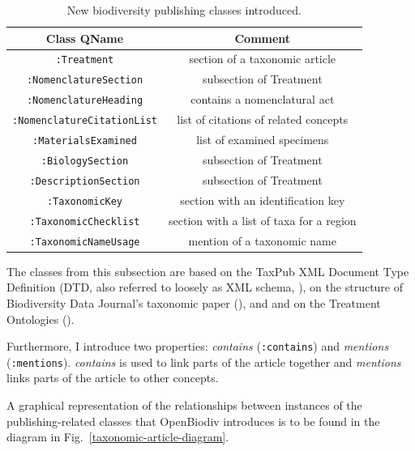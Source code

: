 \begin{table}[h!]
\caption{New biodiversity publishing classes introduced.}
      \begin{tabular}{cc}
        \hline
          Class QName             & Comment\\  \hline
  {\tt :Treatment}                & section of a taxonomic article\\
  {\tt :NomenclatureSection}      & subsection of Treatment\\
  {\tt :NomenclatureHeading}      & contains a nomenclatural act \\
  {\tt :NomenclatureCitationList} & list of citations of related concepts\\
  {\tt :MaterialsExamined}        & list of examined specimens\\
  {\tt :BiologySection}           & subsection of Treatment\\
  {\tt :DescriptionSection}       & subsection of Treatment\\
  {\tt :TaxonomicKey}             & section with an identification key\\
  {\tt :TaxonomicChecklist}       & section with a list of taxa for a region\\ 
  {\tt :TaxonomicNameUsage}       & mention of a taxonomic name\\ \hline

      \end{tabular}
      \label{bibliographic_classes}
\end{table}

The classes from this subsection are based on the TaxPub XML Document Type Definition (DTD, also referred to loosely as XML schema, \cite{catapano_taxpub:_2010}), on the structure of Biodiversity Data Journal's
taxonomic paper (\cite{smith_beyond_2013}), and and on the Treatment Ontologies (\cite{catapano_treatment_2016}).

Furthermore, I introduce two properties: \emph{contains} ({\tt :contains}) and \emph{mentions} ({\tt :mentions}). \emph{contains} is used to link parts of the article together and \emph{mentions} links parts of the article to other concepts.

A graphical representation of the relationships between instances of the publishing-related classes that OpenBiodiv introduces is to be found in the diagram in Fig.~\ref{taxonomic-article-diagram}.

